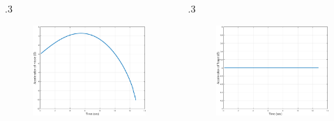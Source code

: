 \documentclass{beamer}
\begin{document}
\begin{frame}
\begin{columns}[c]
	\begin{column} {.3\linewidth}
		\begin{figure}[htb]
			\centering
			\includegraphics[scale = 0.18]{fig/MissileAccelerationXNT5HE0N3.pdf}
		\end{figure}
	\end{column}

	\begin{column} {.3\linewidth}
		\begin{figure}[htb]
			\centering
			\includegraphics[scale = 0.18]{fig/TargetAccelerationXNT5HE0N3.pdf}
		\end{figure}
	\end{column}

\end{columns}
\end{frame}
\end{document}
